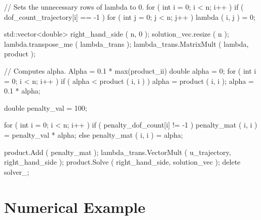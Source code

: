 \documentclass[a4paper, 11pt, twoside]{article}
\begin{document}
	\begin{code}[caption={Computes the restricted Operator $T\Lambda$.}, label=sc:tlambda]
    // Sets the unnecessary rows of lambda to 0.
    for ( int i = 0; i < n; i++ )
    {
        if ( dof_count_trajectory[i] == -1 )
        {
            for ( int j = 0; j < n; j++ )
            {
                lambda ( i, j ) = 0;
            }
        }
    }

    std::vector<double> right_hand_side ( n, 0 );
    solution_vec.resize ( n );
    lambda.transpose_me ( lambda_trans );
    lambda_trans.MatrixMult ( lambda, product );
	\end{code}
	\begin{code}[caption=Computes alpha., label=sc:alpha]
    // Computes alpha. Alpha = 0.1 * max(product_ii)
    double alpha = 0;
    for ( int i = 0; i < n; i++ )
    {
        if ( alpha < product ( i, i ) )
        {
            alpha = product ( i, i );
        }
    }
    alpha = 0.1 * alpha;
	\end{code}
	\begin{code}[caption={Computes $D$.}, label=sc:d]
    double penalty_val = 100;

    for ( int i = 0; i < n; i++ )
    {
        if ( penalty_dof_count[i] != -1 )
        {
            penalty_mat ( i, i ) = penalty_val * alpha;
        }
        else
        {
            penalty_mat ( i, i ) = alpha;
        }
    }

    product.Add ( penalty_mat );
    lambda_trans.VectorMult ( u_trajectory, right_hand_side );
    product.Solve ( right_hand_side, solution_vec );
    delete solver_;
\end{code}



\section{Numerical Example}\label{sectionExample}
%
\end{document}

